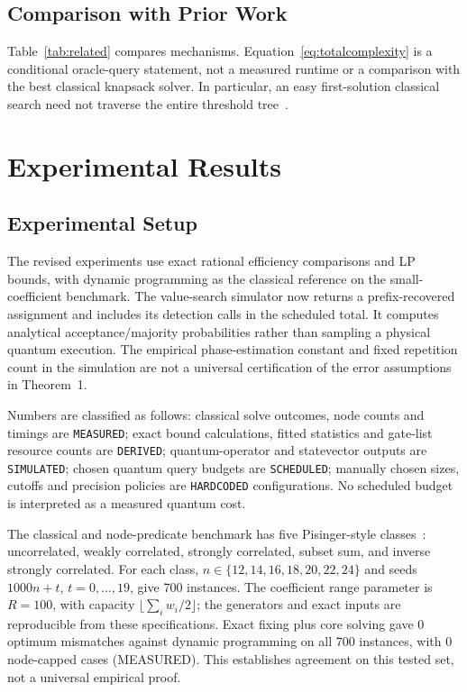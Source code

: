 \documentclass[pdflatex,sn-mathphys-num]{sn-jnl}
\begin{document}
\subsection{Comparison with Prior Work}
Table~\ref{tab:related} compares mechanisms. Equation~\eqref{eq:totalcomplexity} is a conditional oracle-query statement, not a measured runtime or a comparison with the best classical knapsack solver. In particular, an easy first-solution classical search need not traverse the entire threshold tree~\cite{ref35}.

\section{Experimental Results}
\label{sec:experiments}


\subsection{Experimental Setup}
The revised experiments use exact rational efficiency comparisons and LP bounds, with dynamic programming as the classical reference on the small-coefficient benchmark. The value-search simulator now returns a prefix-recovered assignment and includes its detection calls in the scheduled total. It computes analytical acceptance/majority probabilities rather than sampling a physical quantum execution. The empirical phase-estimation constant and fixed repetition count in the simulation are not a universal certification of the error assumptions in Theorem~1.

Numbers are classified as follows: classical solve outcomes, node counts and timings are \texttt{MEASURED}; exact bound calculations, fitted statistics and gate-list resource counts are \texttt{DERIVED}; quantum-operator and statevector outputs are \texttt{SIMULATED}; chosen quantum query budgets are \texttt{SCHEDULED}; manually chosen sizes, cutoffs and precision policies are \texttt{HARDCODED} configurations. No scheduled budget is interpreted as a measured quantum cost.

The classical and node-predicate benchmark has five Pisinger-style classes~\cite{ref4}: uncorrelated, weakly correlated, strongly correlated, subset sum, and inverse strongly correlated. For each class, $n\in\{12,14,16,18,20,22,24\}$ and seeds $1000n+t$, $t=0,\ldots,19$, give 700 instances. The coefficient range parameter is $R=100$, with capacity $\lfloor\sum_iw_i/2\rfloor$; the generators and exact inputs are reproducible from these specifications. Exact fixing plus core solving gave 0 optimum mismatches against dynamic programming on all 700 instances, with 0 node-capped cases (MEASURED). This establishes agreement on this tested set, not a universal empirical proof.
\end{document}
